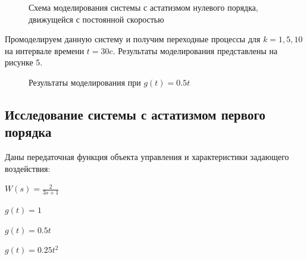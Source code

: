 \documentclass[a4paper, 11pt]{article}
\begin{document}
\begin{figure}[h!]
\caption{Схема моделирования системы с астатизмом нулевого порядка, движущейся с постоянной скоростью}
\label{ris:image}
\end{figure}

\par 
Промоделируем данную систему и получим переходные процессы для $k=1,5,10$ на интервале времени $t=30c$. Результаты моделирования представлены на рисунке 5.

\newpage
\begin{figure}[h!]
\centering
{}
\caption{Результаты моделирования при $g(t)=0.5t$}
\end{figure}

\newpage
\begin{center}
\section{Исследование системы с астатизмом первого порядка}
\end{center}
\par 
Даны передаточная функция объекта управления и характеристики задающего воздействия:
\par
$W(s) = \displaystyle \frac{2}{3s+1}$
\par
$g(t) = 1$
\par
$g(t)=0.5t$
\par
$g(t)=0.25t^2$
\end{document}
